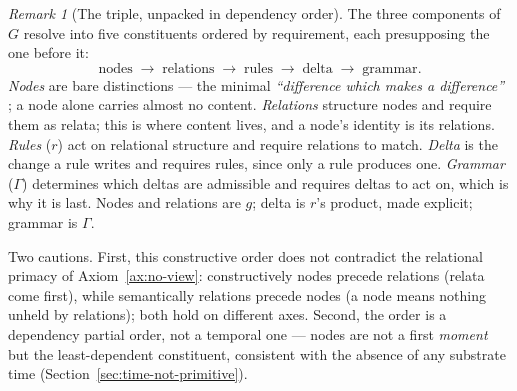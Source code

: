 \documentclass[11pt,a4paper]{article}
\theoremstyle{remark}\newtheorem{remark}[definition]{Remark}
\begin{document}
\begin{remark}[The triple, unpacked in dependency order]\label{rem:dependency-order}
The three components of $G$ resolve into five constituents ordered by requirement, each presupposing the one before it:
\[
\boxed{\text{nodes}\;\to\;\text{relations}\;\to\;\text{rules}\;\to\;\text{delta}\;\to\;\text{grammar}.}
\]
\emph{Nodes} are bare distinctions --- the minimal \emph{``difference which makes a difference''} \citep{bateson1972}; a node alone carries almost no content. \emph{Relations} structure nodes and require them as relata; this is where content lives, and a node's identity is its relations. \emph{Rules} ($r$) act on relational structure and require relations to match. \emph{Delta} is the change a rule writes and requires rules, since only a rule produces one. \emph{Grammar} ($\Gamma$) determines which deltas are admissible and requires deltas to act on, which is why it is last. Nodes and relations are $g$; delta is $r$'s product, made explicit; grammar is $\Gamma$.

Two cautions. First, this constructive order does not contradict the relational primacy of Axiom~\ref{ax:no-view}: constructively nodes precede relations (relata come first), while semantically relations precede nodes (a node means nothing unheld by relations); both hold on different axes. Second, the order is a dependency partial order, not a temporal one --- nodes are not a first \emph{moment} but the least-dependent constituent, consistent with the absence of any substrate time (Section~\ref{sec:time-not-primitive}).
\end{remark}
\end{document}
